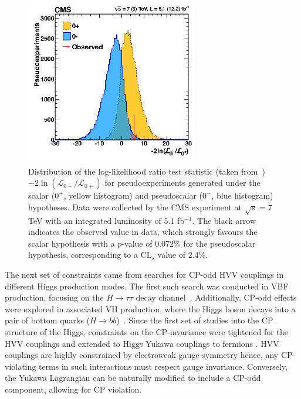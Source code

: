 \begin{figure}[h]
\centering
\includegraphics[width= 0.67\textwidth]{Figures/Chapter2/SpinParity.png}
\caption[Log-likelihood ratio test statistic for scalar vs pseudoscalar hypotheses]{Distribution of the log-likelihood ratio test statistic (taken from~\cite{CP_constraints_2}) $-2\ln(\mathcal{L}_{0-}/\mathcal{L}_{0+})$ for pseudoexperiments generated under the scalar ($0^+$, yellow histogram) and pseudoscalar ($0^-$, blue histogram) hypotheses. Data were collected by the \ac{CMS} experiment at $\sqrt{s} = 7$ TeV with an integrated luminosity of $5.1$ fb$^{-1}$. The black arrow indicates the observed value in data, which strongly favours the scalar hypothesis with a $p$-value of $0.072\%$ for the pseudoscalar hypothesis, corresponding to a $\text{CL}_s$ value of $2.4\%$.}\label{Figure:Chapter2_CPevenVsCPodd}
\end{figure}

The next set of constraints came from searches for CP-odd 
HVV couplings in different Higgs production modes. The first such search was conducted in VBF production, focusing on the 
$H\to\tau\tau$ decay channel~\cite{CP_constraints_4}. Additionally, CP-odd effects were explored in associated VH production, where the Higgs boson decays into a pair of bottom quarks ($H\to bb$)~\cite{CP_constraints_5}. Since the first set of studies into the CP structure of the Higgs, constraints on the CP-invariance were tightened for the HVV couplings and extended to Higgs Yukawa couplings to fermions \cite{CP_constraints_6,CP_constraints_7,CP_constraints_8,CP_constraints_9,CP_constraints_10,CP_constraints_11,CP_constraints_12,CP_constraints_13,HiggsCP_CMS_2021,CP_constraints_15,CP_constraints_16,CP_constraints_17,CP_constraints_18,CP_constraints_19,CP_constraints_20,CP_constraints_21,CP_constraints_22}. HVV couplings are highly constrained by electroweak gauge symmetry hence, any CP-violating terms in such interactions must respect gauge invariance. Conversely, the Yukawa Lagrangian can be naturally modified to include a CP-odd component, allowing for CP violation.
\newpage
